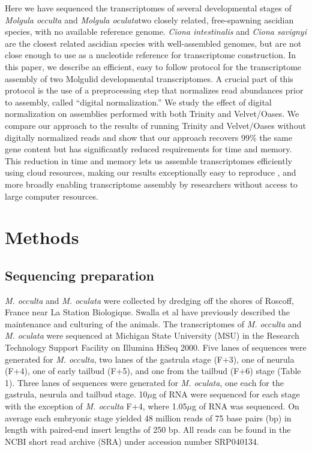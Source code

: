 Here we have sequenced the transcriptomes of several developmental stages of \textit{Molgula occulta} and \textit{Molgula oculata}\textemdash two closely related, free-spawning ascidian species, with no available reference genome. \textit{Ciona intestinalis} and \textit{Ciona savignyi} are the closest related ascidian species with well-assembled genomes, but are not close enough to use as a nucleotide reference for transcriptome construction. In this paper, we describe an efficient, easy to follow protocol for the transcriptome assembly of two Molgulid developmental transcriptomes. A crucial part of this protocol is the use of a preprocessing step that normalizes read abundances prior to assembly, called ``digital normalization.'' We study the effect of digital normalization on assemblies performed with both Trinity and Velvet/Oases.  We compare our approach to the results of running Trinity and Velvet/Oases without digitally normalized reads and show that our approach recovers 99\% the same gene content but has significantly reduced requirements for time and memory.  This reduction in time and memory lets us assemble transcriptomes efficiently using cloud resources, making our results exceptionally easy to reproduce \citep{haas_novo_2013}, and more broadly enabling transcriptome assembly by researchers without access to large computer resources.

\section{Methods}
\subsection{Sequencing preparation}
\textit{M. occulta} and \textit{M. oculata} were collected by dredging off the shores of Roscoff, France near La Station Biologique. Swalla et al have previously described the maintenance \citep{swalla_interspecific_1990} and culturing \citep{swalla_multigene_1999} of the animals. The transcriptomes of \textit{M. occulta} and \textit{M. oculata} were sequenced at Michigan State University (MSU) in the Research Technology Support Facility on Illumina HiSeq 2000. Five lanes of sequences were generated for \textit{M. occulta}, two lanes of the gastrula stage (F+3), one of neurula (F+4), one of early tailbud (F+5), and one from the tailbud (F+6) stage (Table 1). Three lanes of sequences were generated for \textit{M. oculata}, one each for the gastrula, neurula and tailbud stage. 10$\mu$g of RNA were sequenced for each stage with the exception of \textit{M. occulta} F+4, where 1.05$\mu$g of RNA was sequenced. On average each embryonic stage yielded 48 million reads of 75 base pairs (bp) in length with paired-end insert lengths of 250 bp. All reads can be found in the NCBI short read archive (SRA) under accession number SRP040134. 

